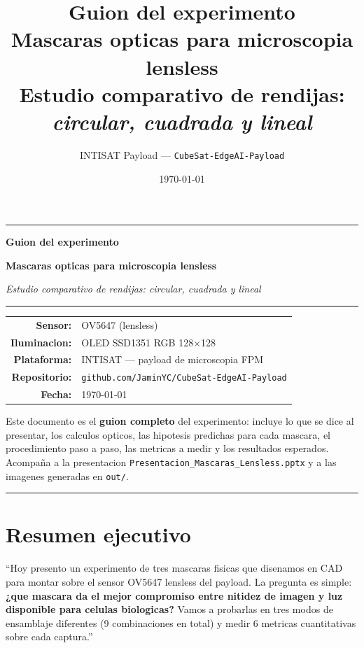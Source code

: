 \documentclass[11pt,a4paper,oneside]{report}
\title{
  {\Huge\bfseries\color{intisat} Guion del experimento}\\[0.3em]
  {\LARGE Mascaras opticas para microscopia lensless}\\[0.6em]
  {\large Estudio comparativo de rendijas: \textit{circular, cuadrada y lineal}}
}
\author{INTISAT Payload --- \texttt{CubeSat-EdgeAI-Payload}}
\date{\today}
\begin{document}
\begin{titlepage}
\centering
\vspace*{1cm}
{\color{intisat}\rule{\textwidth}{2pt}}
\vspace{0.6cm}

{\Huge\bfseries\color{intisat} Guion del experimento}

\vspace{0.3cm}
{\LARGE\bfseries Mascaras opticas para microscopia lensless}

\vspace{0.6cm}
{\Large\itshape Estudio comparativo de rendijas: circular, cuadrada y lineal}

\vspace{1cm}
{\color{intisataccent}\rule{0.6\textwidth}{1pt}}

\vspace{2.5cm}

\begin{tabular}{rl}
\textbf{Sensor:} & OV5647 (lensless) \\
\textbf{Iluminacion:} & OLED SSD1351 RGB 128$\times$128 \\
\textbf{Plataforma:} & INTISAT --- payload de microscopia FPM \\
\textbf{Repositorio:} & \texttt{github.com/JaminYC/CubeSat-EdgeAI-Payload} \\
\textbf{Fecha:} & \today
\end{tabular}

\vfill

{\large
Este documento es el \textbf{guion completo} del experimento: incluye lo que se dice al
presentar, los calculos opticos, las hipotesis predichas para cada mascara,
el procedimiento paso a paso, las metricas a medir y los resultados esperados.
Acompaña a la presentacion \texttt{Presentacion\_Mascaras\_Lensless.pptx}
y a las imagenes generadas en \texttt{out/}.
}

\vspace{1.2cm}
{\color{intisat}\rule{\textwidth}{2pt}}
\end{titlepage}

\tableofcontents
\clearpage

\chapter{Resumen ejecutivo}

\begin{decir}
``Hoy presento un experimento de tres mascaras fisicas que disenamos en CAD para montar
sobre el sensor OV5647 lensless del payload. La pregunta es simple: \textbf{¿que mascara
da el mejor compromiso entre nitidez de imagen y luz disponible para celulas biologicas?}
Vamos a probarlas en tres modos de ensamblaje diferentes (9 combinaciones en total)
y medir 6 metricas cuantitativas sobre cada captura.''
\end{decir}
\end{document}
